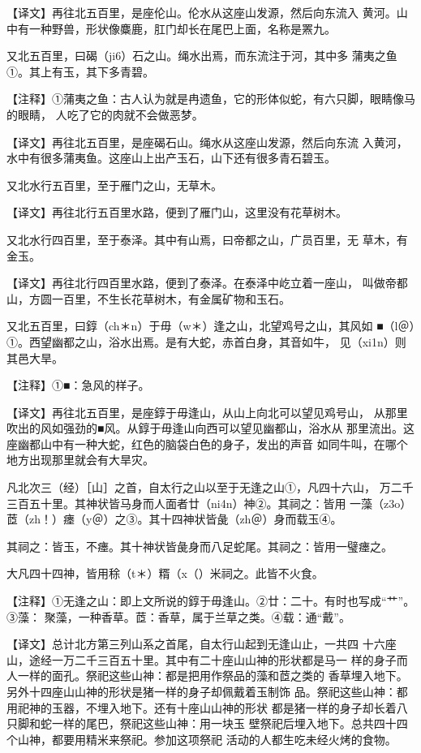 \documentclass[a4paper,12pt,UTF8,twoside]{ctexbook}
\begin{document}
【译文】再往北五百里，是座伦山。伦水从这座山发源，然后向东流入 黄河。山中有一种野兽，形状像麋鹿，肛门却长在尾巴上面，名称是罴九。

又北五百里，曰碣（ji6）石之山。绳水出焉，而东流注于河，其中多 蒲夷之鱼①。其上有玉，其下多青碧。

【注释】①蒲夷之鱼：古人认为就是冉遗鱼，它的形体似蛇，有六只脚，眼睛像马的眼睛， 人吃了它的肉就不会做恶梦。

【译文】再往北五百里，是座碣石山。绳水从这座山发源，然后向东流 入黄河，水中有很多蒲夷鱼。这座山上出产玉石，山下还有很多青石碧玉。

又北水行五百里，至于雁门之山，无草木。

【译文】再往北行五百里水路，便到了雁门山，这里没有花草树木。

又北水行四百里，至于泰泽。其中有山焉，曰帝都之山，广员百里，无 草木，有金玉。

【译文】再往北行四百里水路，便到了泰泽。在泰泽中屹立着一座山， 叫做帝都山，方圆一百里，不生长花草树木，有金属矿物和玉石。

又北五百里，曰錞（ch＊n）于毋（w＊）逢之山，北望鸡号之山，其风如 ■（l＠）①。西望幽都之山，浴水出焉。是有大蛇，赤首白身，其音如牛， 见（xi1n）则其邑大旱。

【注释】①■：急风的样子。

【译文】再往北五百里，是座錞于毋逢山，从山上向北可以望见鸡号山， 从那里吹出的风如强劲的■风。从錞于毋逢山向西可以望见幽都山，浴水从 那里流出。这座幽都山中有一种大蛇，红色的脑袋白色的身子，发出的声音 如同牛叫，在哪个地方出现那里就会有大旱灾。

凡北次三（经）［山］之首，自太行之山以至于无逢之山①，凡四十六山， 万二千三百五十里。其神状皆马身而人面者廿（ni4n）神②。其祠之：皆用 一藻（z3o）茝（zh！）瘗（y＠）之③。其十四神状皆彘（zh＠）身而载玉④。

其祠之：皆玉，不瘗。其十神状皆彘身而八足蛇尾。其祠之：皆用一璧瘗之。

大凡四十四神，皆用稌（t＊）糈（x（）米祠之。此皆不火食。

【注释】①无逢之山：即上文所说的錞于毋逢山。②廿：二十。有时也写成“艹”。③藻： 聚藻，一种香草。茝：香草，属于兰草之类。④载：通“戴”。

【译文】总计北方第三列山系之首尾，自太行山起到无逢山止，一共四 十六座山，途经一万二千三百五十里。其中有二十座山山神的形状都是马一 样的身子而人一样的面孔。祭祀这些山神：都是把用作祭品的藻和茝之类的 香草埋入地下。另外十四座山山神的形状是猪一样的身子却佩戴着玉制饰 品。祭祀这些山神：都用祀神的玉器，不埋入地下。还有十座山山神的形状 都是猪一样的身子却长着八只脚和蛇一样的尾巴，祭祀这些山神：用一块玉 壁祭祀后埋入地下。总共四十四个山神，都要用精米来祭祀。参加这项祭祀 活动的人都生吃未经火烤的食物。
\end{document}
